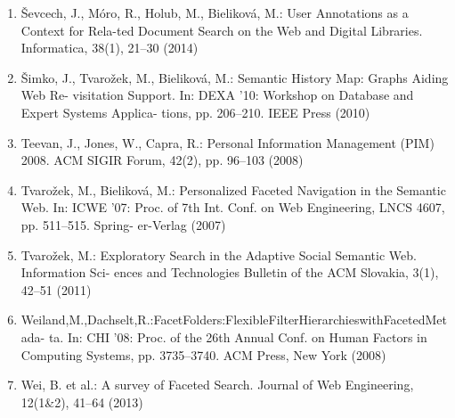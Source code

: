 \documentclass{llncs}
\begin{document}
\begin{enumerate}
\item Ševcech, J., Móro, R., Holub, M., Bieliková, M.: User Annotations as a Context for Rela-ted Document Search on the Web and Digital Libraries. Informatica, 38(1), 21–30 (2014)
\item Šimko, J., Tvarožek, M., Bieliková, M.: Semantic History Map: Graphs Aiding Web Re- visitation Support. In: DEXA '10: Workshop on Database and Expert Systems Applica- tions, pp. 206–210. IEEE Press (2010)
\item Teevan, J., Jones, W., Capra, R.: Personal Information Management (PIM) 2008. ACM SIGIR Forum, 42(2), pp. 96–103 (2008)
\item Tvarožek, M., Bieliková, M.: Personalized Faceted Navigation in the Semantic Web. In: ICWE '07: Proc. of 7th Int. Conf. on Web Engineering, LNCS 4607, pp. 511–515. Spring- er-Verlag (2007)
\item Tvarožek, M.: Exploratory Search in the Adaptive Social Semantic Web. Information Sci- ences and Technologies Bulletin of the ACM Slovakia, 3(1), 42–51 (2011)
\item Weiland,M.,Dachselt,R.:FacetFolders:FlexibleFilterHierarchieswithFacetedMetada- ta. In: CHI '08: Proc. of the 26th Annual Conf. on Human Factors in Computing Systems, pp. 3735–3740. ACM Press, New York (2008)
\item  Wei, B. et al.: A survey of Faceted Search. Journal of Web Engineering, 12(1\&2), 41–64 (2013)
\end{enumerate}
\end{document}
